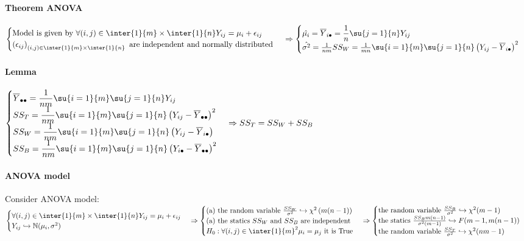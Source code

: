 \paragraph{Theorem ANOVA}
$
\begin{cases}
	\text{Model is given by } \forall (i,j)\in\inter{1}{m}\times\inter{1}{n}Y_{ij}=\mu_{i}+\epsilon_{ij}\\
	\left(\epsilon_{ij}\right)_{(i,j)\in\inter{1}{m}\times\inter{1}{n}}\text{ are independent and normally distributed}
\end{cases}\\
\Rightarrow
\begin{cases}
	\hat{\mu_{i}}=\overline{Y}_{i\bullet} = \dfrac{1}{n}\su{{j=1}}{n}Y_{ij}\\
	\hat{\sigma^{2}} = \frac{1}{nm}SS_{W} = \frac{1}{mn}\su{ {i=1}}{m}\su{{j=1}}{n}\left( Y_{ij}-\overline{Y}_{i\bullet} \right)^{2}
\end{cases}
$

\paragraph{Lemma}
$
\begin{cases}
	\overline{Y}_{\bullet\bullet}=\dfrac{1}{nm}\su{{i=1}}{m}\su{{j=1}}{n}Y_{ij}\\
	SS_{T}=\dfrac{1}{nm}\su{{i=1}}{m}\su{{j=1}}{n}\left(Y_{ij}-\overline{Y}_{\bullet\bullet}\right)^{2}\\
	SS_{W}=\dfrac{1}{nm}\su{{i=1}}{m}\su{{j=1}}{n}\left(Y_{ij}-\overline{Y}_{i\bullet}\right)\\
	SS_{B}=\dfrac{1}{nm}\su{{i=1}}{m}\su{{j=1}}{n}\left(Y_{i\bullet}-\overline{Y}_{\bullet\bullet}\right)^{2}\\
\end{cases}
\Rightarrow
SS_{T}=SS_{W}+SS_{B}
$
\paragraph{ANOVA model}
Consider ANOVA model:
$
\begin{cases}
\forall (i,j)\in\inter{1}{m}\times\inter{1}{n}Y_{ij}=\mu_{i}+\epsilon_{ij}\\
Y_{ij}\hookrightarrow\mathbb{N}(\mu_{i},\sigma^{2})
\end{cases}
\Rightarrow
\begin{cases}
	\text{(a) the random variable }\frac{SS_{W}}{\sigma^{2}}\hookrightarrow \chi^{2}\left(m(n-1)\right)\\
	\text{(a) the statics }SS_{W}\text{ and }SS_{B}\text{ are independent}\\
	H_{0}:\forall (i,j)\in\inter{1}{m}^{2} \mu_{i}=\mu_{j}\text{ it is True}
\end{cases}
\Rightarrow
\begin{cases}
	\text{the random variable }\frac{SS_{B}}{\sigma^{2}}\hookrightarrow\chi^{2}(m-1)\\
	\text{the statics }\frac{SS_{B}m(n-1)}{\sigma^{2}(m-1)}\hookrightarrow F(m-1,m(n-1))\\
	\text{the random variable }\frac{SS_{T}}{\sigma^{2}}\hookrightarrow \chi^{2}(nm-1)
\end{cases}
$

